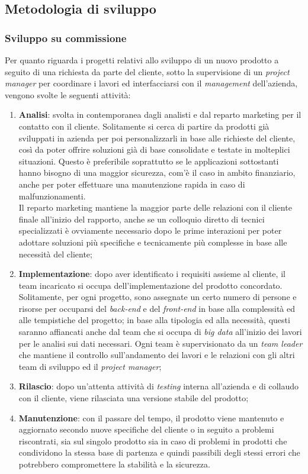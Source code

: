 \subsection{Metodologia di sviluppo}

\subsubsection{Sviluppo su commissione} \label{commissione}
Per quanto riguarda i progetti relativi allo sviluppo di un nuovo prodotto a seguito di una richiesta da parte del cliente, sotto la supervisione di un \textit{project manager} per coordinare i lavori ed interfacciarsi con il \textit{management} dell'azienda, vengono svolte le seguenti attività:
\begin{enumerate}
	\item \textbf{Analisi}: svolta in contemporanea dagli analisti e dal reparto marketing per il contatto con il cliente. Solitamente si cerca di partire da prodotti già sviluppati in azienda per poi personalizzarli in base alle richieste del cliente, così da poter offrire soluzioni già di base consolidate e testate in molteplici situazioni. Questo è preferibile soprattutto se le applicazioni sottostanti hanno bisogno di una maggior sicurezza, com'è il caso in ambito finanziario, anche per poter effettuare una manutenzione rapida in caso di malfunzionamenti.\\
	Il reparto marketing mantiene la maggior parte delle relazioni con il cliente finale all'inizio del rapporto, anche se un colloquio diretto di tecnici specializzati è ovviamente necessario dopo le prime interazioni per poter adottare soluzioni più specifiche e tecnicamente più complesse in base alle necessità del cliente;
	\item \textbf{Implementazione}: dopo aver identificato i requisiti assieme al cliente, il team incaricato si occupa dell'implementazione del prodotto concordato. Solitamente, per ogni progetto, sono assegnate un certo numero di persone e risorse per occuparsi del \textit{back-end} e del \textit{front-end} in base alla complessità ed alle tempistiche del progetto; in base alla tipologia ed alla necessità, questi saranno affiancati anche dal team che si occupa di \textit{big data} all'inizio dei lavori per le analisi sui dati necessari. Ogni team è supervisionato da un \textit{team leader} che mantiene il controllo sull'andamento dei lavori e le relazioni con gli altri team di sviluppo ed il \textit{project manager};
	\item \textbf{Rilascio}: dopo un'attenta attività di \textit{testing} interna all'azienda e di collaudo con il cliente, viene rilasciata una versione stabile del prodotto;
	\item \textbf{Manutenzione}: con il passare del tempo, il prodotto viene mantenuto e aggiornato secondo nuove specifiche del cliente o in seguito a problemi riscontrati, sia sul singolo prodotto sia in caso di problemi in prodotti che condividono la stessa base di partenza e quindi passibili degli stessi errori che potrebbero compromettere la stabilità e la sicurezza.
\end{enumerate}

